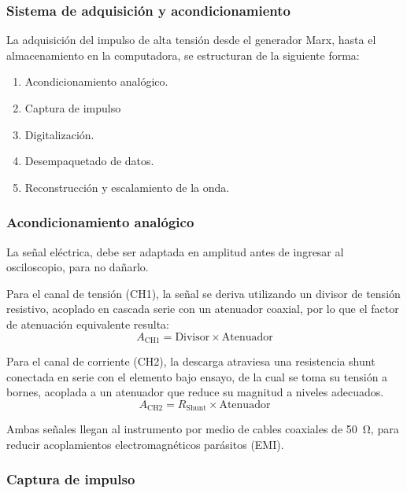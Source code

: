 \subsubsection{Sistema de adquisición y acondicionamiento}
\label{subsubsec:arquitectura_flujo}

La adquisición del impulso de alta tensión desde el generador Marx, hasta el almacenamiento en la computadora, se estructuran de la siguiente forma:

\begin{enumerate}
    \item Acondicionamiento analógico.
    \item Captura de impulso
    \item Digitalización.
    \item Desempaquetado de datos.
    \item Reconstrucción y escalamiento de la onda.
\end{enumerate}

\subsubsection{Acondicionamiento analógico}

La señal eléctrica, debe ser adaptada en amplitud antes de ingresar al osciloscopio, para no dañarlo.

Para el canal de tensión (CH1), la señal se deriva utilizando un divisor de tensión resistivo, acoplado en cascada serie con un atenuador coaxial, por lo que el factor de atenuación equivalente resulta:
\begin{equation}
    A_{\text{CH1}} = \text{Divisor} \times \text{Atenuador}
    \label{eq:atenuacion_tension}
\end{equation}

Para el canal de corriente (CH2), la descarga atraviesa una resistencia shunt conectada en serie con el elemento bajo ensayo, de la cual se toma su tensión a bornes, acoplada a un atenuador que reduce su magnitud a niveles adecuados.
\begin{equation}
    A_{\text{CH2}} = R_\text{Shunt} \times \text{Atenuador}
    \label{eq:atenuacion_corriente}
\end{equation}

Ambas señales llegan al instrumento por medio de cables coaxiales de \qty{50}{\ohm}, para reducir acoplamientos electromagnéticos parásitos (EMI).

\subsubsection{Captura de impulso}
\label{subsec:captura_impulso}

